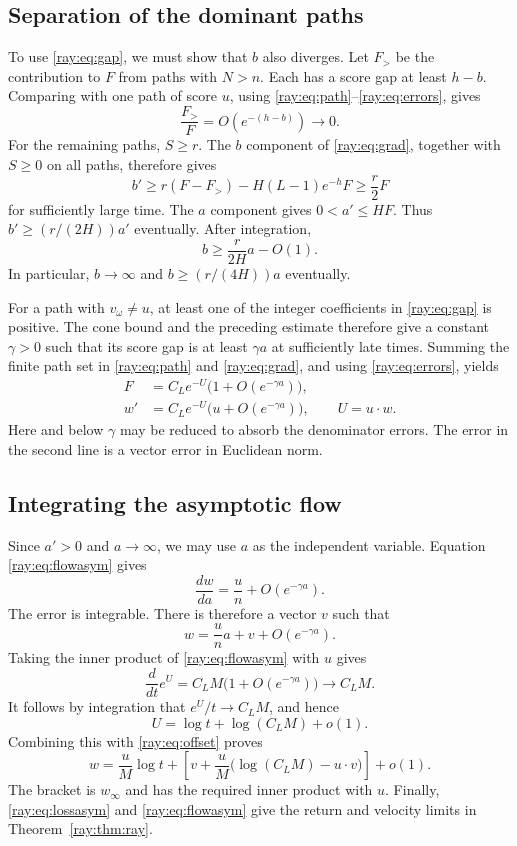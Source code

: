 \documentclass[11pt]{article}
\begin{document}
\subsection{Separation of the dominant paths}
To use \eqref{ray:eq:gap}, we must show that $b$ also diverges. Let $F_>$ be
the contribution to $F$ from paths with $N>n$. Each has a score gap at
least $h-b$. Comparing with one path of score $u$, using
\eqref{ray:eq:path}--\eqref{ray:eq:errors}, gives
\begin{equation}\label{ray:eq:high}
 \frac{F_>}{F}=O(e^{-(h-b)})\longrightarrow0.
\end{equation}
For the remaining paths, $S\ge r$. The $b$ component of
\eqref{ray:eq:grad}, together with $S\ge0$ on all paths, therefore gives
\[
 b'\ge r(F-F_>)-H(L-1)e^{-h}F\ge\frac r2 F
\]
for sufficiently large time. The $a$ component gives $0<a'\le HF$.
Thus $b'\ge(r/(2H))a'$ eventually. After integration,
\[
 b\ge\frac{r}{2H}a-O(1).
\]
In particular, $b\to\infty$ and $b\ge(r/(4H))a$ eventually.

For a path with $v_\omega\ne u$, at least one of the integer coefficients
in \eqref{ray:eq:gap} is positive. The cone bound and the preceding estimate
therefore give a constant $\gamma>0$ such that its score gap is at least
$\gamma a$ at sufficiently late times. Summing the finite path set in
\eqref{ray:eq:path} and \eqref{ray:eq:grad}, and using \eqref{ray:eq:errors}, yields
\begin{align}
 F&=C_Le^{-U}\bigl(1+O(e^{-\gamma a})\bigr),\label{ray:eq:lossasym}\\
 w'&=C_Le^{-U}\bigl(u+O(e^{-\gamma a})\bigr),
 \qquad U=u\cdot w.\label{ray:eq:flowasym}
\end{align}
Here and below $\gamma$ may be reduced to absorb the denominator errors.
The error in the second line is a vector error in Euclidean norm.

\subsection{Integrating the asymptotic flow}
Since $a'>0$ and $a\to\infty$, we may use $a$ as the independent variable.
Equation \eqref{ray:eq:flowasym} gives
\[
 \frac{dw}{da}=\frac un+O(e^{-\gamma a}).
\]
The error is integrable. There is therefore a vector $v$ such that
\begin{equation}\label{ray:eq:offset}
 w=\frac un a+v+O(e^{-\gamma a}).
\end{equation}
Taking the inner product of \eqref{ray:eq:flowasym} with $u$ gives
\[
 \frac{d}{dt}e^U=C_LM\bigl(1+O(e^{-\gamma a})\bigr)
 \longrightarrow C_LM.
\]
It follows by integration that $e^U/t\to C_LM$, and hence
\[
 U=\log t+\log(C_LM)+o(1).
\]
Combining this with \eqref{ray:eq:offset} proves
\[
 w=\frac uM\log t+
 \left[v+\frac uM\bigl(\log(C_LM)-u\cdot v\bigr)\right]+o(1).
\]
The bracket is $w_\infty$ and has the required inner product with $u$.
Finally, \eqref{ray:eq:lossasym} and \eqref{ray:eq:flowasym} give the return and
velocity limits in Theorem~\ref{ray:thm:ray}.
\end{document}
